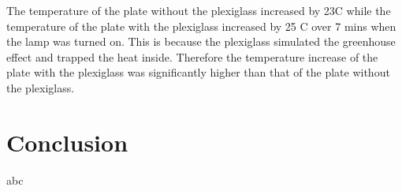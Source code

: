 \documentclass[a4paper, 12pt, english]{article}
\begin{document}
The temperature of the plate without the plexiglass increased by 23\degree C
while the temperature of the plate with the plexiglass increased by 25\degree
C over 7 mins when the lamp was turned on. This is because the plexiglass simulated the greenhouse effect and trapped
the heat inside. Therefore the temperature increase of the plate with the
plexiglass was significantly higher than that of the plate without the
plexiglass.
\section{Conclusion}
abc
\end{document}
